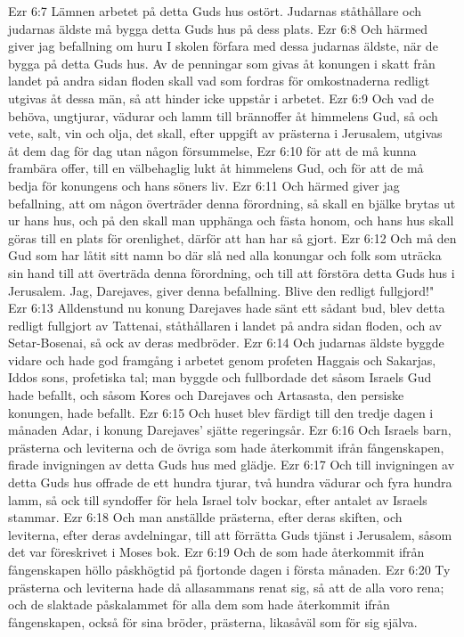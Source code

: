 Ezr 6:7  Lämnen arbetet på detta Guds hus ostört. Judarnas ståthållare och judarnas äldste må bygga detta Guds hus på dess plats.
Ezr 6:8  Och härmed giver jag befallning om huru I skolen förfara med dessa judarnas äldste, när de bygga på detta Guds hus. Av de penningar som givas åt konungen i skatt från landet på andra sidan floden skall vad som fordras för omkostnaderna redligt utgivas åt dessa män, så att hinder icke uppstår i arbetet.
Ezr 6:9  Och vad de behöva, ungtjurar, vädurar och lamm till brännoffer åt himmelens Gud, så och vete, salt, vin och olja, det skall, efter uppgift av prästerna i Jerusalem, utgivas åt dem dag för dag utan någon försummelse,
Ezr 6:10  för att de må kunna frambära offer, till en välbehaglig lukt åt himmelens Gud, och för att de må bedja för konungens och hans söners liv.
Ezr 6:11  Och härmed giver jag befallning, att om någon överträder denna förordning, så skall en bjälke brytas ut ur hans hus, och på den skall man upphänga och fästa honom, och hans hus skall göras till en plats för orenlighet, därför att han har så gjort.
Ezr 6:12  Och må den Gud som har låtit sitt namn bo där slå ned alla konungar och folk som uträcka sin hand till att överträda denna förordning, och till att förstöra detta Guds hus i Jerusalem. Jag, Darejaves, giver denna befallning. Blive den redligt fullgjord!"
Ezr 6:13  Alldenstund nu konung Darejaves hade sänt ett sådant bud, blev detta redligt fullgjort av Tattenai, ståthållaren i landet på andra sidan floden, och av Setar-Bosenai, så ock av deras medbröder.
Ezr 6:14  Och judarnas äldste byggde vidare och hade god framgång i arbetet genom profeten Haggais och Sakarjas, Iddos sons, profetiska tal; man byggde och fullbordade det såsom Israels Gud hade befallt, och såsom Kores och Darejaves och Artasasta, den persiske konungen, hade befallt.
Ezr 6:15  Och huset blev färdigt till den tredje dagen i månaden Adar, i konung Darejaves' sjätte regeringsår.
Ezr 6:16  Och Israels barn, prästerna och leviterna och de övriga som hade återkommit ifrån fångenskapen, firade invigningen av detta Guds hus med glädje.
Ezr 6:17  Och till invigningen av detta Guds hus offrade de ett hundra tjurar, två hundra vädurar och fyra hundra lamm, så ock till syndoffer för hela Israel tolv bockar, efter antalet av Israels stammar.
Ezr 6:18  Och man anställde prästerna, efter deras skiften, och leviterna, efter deras avdelningar, till att förrätta Guds tjänst i Jerusalem, såsom det var föreskrivet i Moses bok.
Ezr 6:19  Och de som hade återkommit ifrån fångenskapen höllo påskhögtid på fjortonde dagen i första månaden.
Ezr 6:20  Ty prästerna och leviterna hade då allasammans renat sig, så att de alla voro rena; och de slaktade påskalammet för alla dem som hade återkommit ifrån fångenskapen, också för sina bröder, prästerna, likasåväl som för sig själva.
